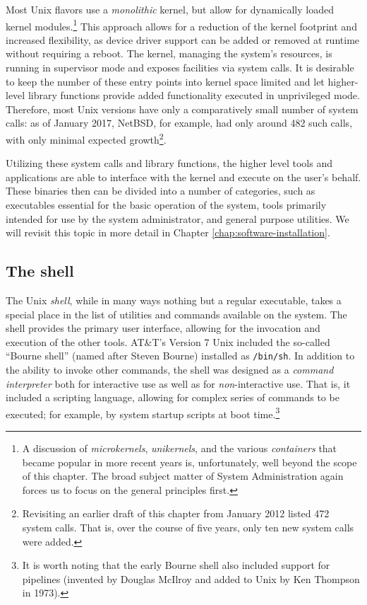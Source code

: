 Most Unix flavors use a {\em
monolithic} kernel, but allow
for dynamically loaded kernel
modules.\footnote{A
discussion of {\em microkernels},
{\em unikernels}, and the various
{\em containers} that became popular
in more recent years is, unfortunately, well beyond
the scope of this chapter.  The broad subject matter
of System Administration again forces us to focus on
the general principles first.}    This approach allows
for a reduction of the kernel footprint and increased
flexibility, as device driver support can be added or
removed at runtime without requiring a reboot.  The
kernel, managing the system's resources, is running in
supervisor mode and exposes facilities via system
calls.  It is desirable to keep the number of these
entry points into kernel space limited and let
higher-level library functions provide added
functionality executed in unprivileged mode.
Therefore, most Unix versions have only a
comparatively small number of system calls: as of
January 2017,  NetBSD, for example,
had only around 482 such
calls\cite{history:nbsd-syscalls}, with only minimal
expected growth\footnote{Revisiting an earlier draft
of this chapter from January 2012 listed 472 system
calls.  That is, over the course of five years, only
ten new system calls were added.}.

Utilizing these system calls and library functions,
the higher level tools and applications are able to
interface with the kernel and execute on the user's
behalf.  These binaries then can be divided into a
number of categories, such as executables essential
for the basic operation of the system, tools primarily
intended for use by the system administrator, and
general purpose utilities.  We will revisit this
topic in more detail in Chapter
\ref{chap:software-installation}.

\subsection{The shell}
\label{unix:basics:shell}

The Unix {\em shell}, while in many ways nothing but a
regular executable, takes a special place in the list
of utilities and commands available on the system.
The shell provides the primary user interface,
allowing for the invocation and execution of the other
tools.  AT\&T's Version 7 Unix included the so-called
``Bourne shell'' (named after
Steven Bourne) installed
as {\tt /bin/sh}.  In addition to the ability to
invoke other commands, the shell was designed as a
{\em command interpreter} both for interactive use as
well as for {\em non}-interactive use.  That is, it
included a scripting language, allowing for complex
series of commands to be executed; for example, by
system startup scripts at boot time.\footnote{It is
worth noting that the early Bourne shell also included
support for pipelines (invented by Douglas McIlroy and
added to Unix by Ken Thompson in 1973).}

